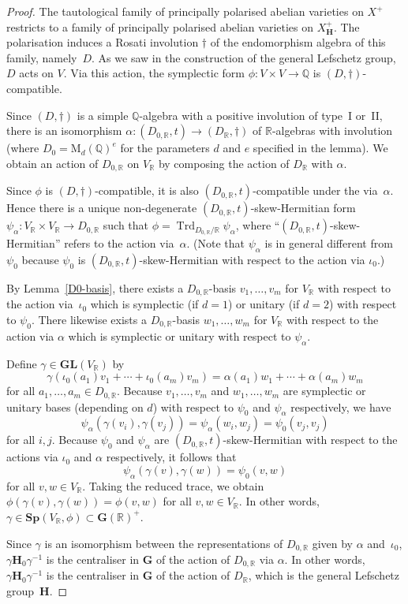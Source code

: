 \documentclass[JEP,XML,SOM,Unicode,NoFloatCountersInSection]{cedram}
\newcommand{\bQ}{\mathbb{Q}}
\newcommand{\bR}{\mathbb{R}}
\newcommand{\gG}{\mathbf{G}}
\newcommand{\gGL}{\mathbf{GL}}
\newcommand{\gH}{\mathbf{H}}
\newcommand{\gSp}{\mathbf{Sp}}
\newcommand{\rM}{\mathrm{M}}
\DeclareMathOperator{\Trd}{Trd}
\begin{document}
\begin{proof}
The tautological family of principally polarised abelian varieties on $X^+$ restricts to a family of principally polarised abelian varieties on $X_\gH^+$.
The polarisation induces a Rosati involution $\dag$ of the endomorphism algebra of this family, namely~$D$.
As we saw in the construction of the general Lefschetz group, $D$ acts on $V$.
Via this action, the symplectic form $\phi \colon V \times V \to \bQ$ is $(D,\dag)$-compatible.

Since $(D,\dag)$ is a simple $\bQ$-algebra with a positive involution of type~I or~II, there is an isomorphism $\alpha \colon (D_{0,\bR},t) \to (D_\bR,\dag)$ of $\bR$-algebras with involution (where $D_0 = \rM_d(\bQ)^e$ for the parameters $d$ and $e$ specified in the lemma).
We obtain an action of $D_{0,\bR}$ on $V_\bR$ by composing the action of $D_\bR$ with $\alpha$.

Since $\phi$ is $(D,\dag)$-compatible, it is also $(D_{0,\bR},t)$-compatible under the via~$\alpha$.
Hence there is a unique non-degenerate $(D_{0,\bR},t)$-skew-Hermitian form $\psi_\alpha \colon V_\bR \times V_\bR \to D_{0,\bR}$ such that $\phi = \Trd_{D_{0,\bR}/\bR} \psi_\alpha$, where ``$(D_{0,\bR},t)$-skew-Hermitian'' refers to the action via~$\alpha$.
(Note that $\psi_\alpha$ is in general different from $\psi_0$ because $\psi_0$ is $(D_{0,\bR},t)$-skew-Hermitian with respect to the action via $\iota_0$.)

By Lemma~\ref{D0-basis}, there exists a $D_{0,\bR}$-basis $v_1, \dotsc, v_m$ for $V_\bR$ with respect to the action via~$\iota_0$ which is symplectic (if $d=1$) or unitary (if $d=2$) with respect to $\psi_0$.
There likewise exists a $D_{0,\bR}$-basis $w_1, \dotsc, w_m$ for $V_\bR$ with respect to the action via $\alpha$ which is symplectic or unitary with respect to $\psi_\alpha$.

Define $\gamma \in \gGL(V_\bR)$ by
\[
\gamma(\iota_0(a_1)v_1 + \dotsb + \iota_0(a_m)v_m) = \alpha(a_1)w_1 + \dotsb + \alpha(a_m)w_m
\]
for all $a_1, \dotsc, a_m \in D_{0,\bR}$.
Because $v_1, \dotsc, v_m$ and $w_1, \dotsc, w_m$ are symplectic or unitary bases (depending on $d$) with respect to $\psi_0$ and $\psi_\alpha$ respectively, we have
\[
\psi_\alpha(\gamma(v_i), \gamma(v_j)) = \psi_\alpha(w_i, w_j) = \psi_0(v_j, v_j)
\]
for all $i, j$.
Because $\psi_0$ and $\psi_\alpha$ are $(D_{0,\bR},t)$-skew-Hermitian with respect to the actions via $\iota_0$ and $\alpha$ respectively, it follows that
\[
\psi_\alpha(\gamma(v), \gamma(w)) = \psi_0(v, w)
\]
for all $v, w \in V_\bR$.
Taking the reduced trace, we obtain $\phi(\gamma(v), \gamma(w)) = \phi(v, w)$ for all $v, w \in V_\bR$.
In other words, $\gamma \in \gSp(V_\bR, \phi) \subset \gG(\bR)^+$.

Since $\gamma$ is an isomorphism between the representations of $D_{0,\bR}$ given by $\alpha$ and~$\iota_0$, $\gamma \gH_0 \gamma^{-1}$ is the centraliser in $\gG$ of the action of $D_{0,\bR}$ via $\alpha$.
In other words, $\gamma \gH_0 \gamma^{-1}$ is the centraliser in $\gG$ of the action of $D_\bR$, which is the general Lefschetz group~$\gH$.
\end{proof}
\end{document}
